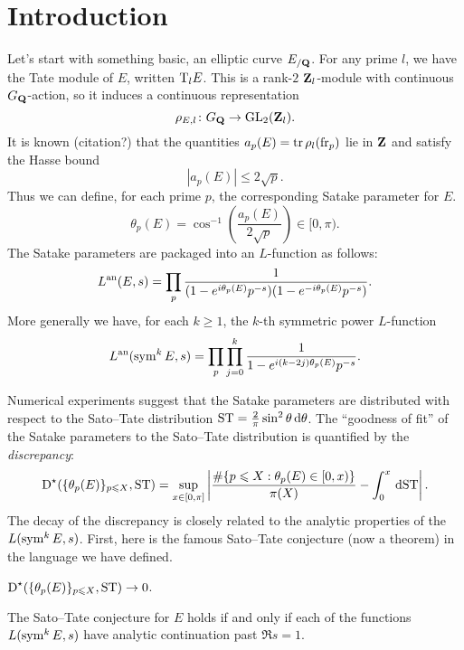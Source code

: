 
\chapter{Introduction}





Let's start with something basic, an elliptic curve $E_{/\mathbf{Q}}$. For any 
prime $l$, we have the Tate module of $E$, written $\mathrm{T}_l E$. This is a 
rank-$2$ $\mathbf{Z}_l$-module with continuous $G_{\mathbf{Q}}$-action, so it induces a 
continuous representation 
\[
	\rho_{E,l} \colon G_{\mathbf{Q}} \to \operatorname{GL}_2(\mathbf{Z}_l) .
\]
It is known (citation?) that the quantities $a_p(E) = \operatorname{tr} \rho_l(\mathrm{fr}_p)$ lie 
in $\mathbf{Z}$ and satisfy the Hasse bound 
\[
	|a_p(E)| \leqslant 2\sqrt p .
\]
Thus we can define, for each prime $p$, the corresponding Satake parameter for 
$E$. 
\[
	\theta_p(E) = \cos^{-1}\left(\frac{a_p(E)}{2\sqrt p}\right) \in [0,\pi) .
\]
The Satake parameters are packaged into an $L$-function as follows:
\[
	L^{\mathrm{an}}(E,s) = \prod_p \frac{1}{(1 - e^{i \theta_p(E)} p^{-s})(1- e^{-i \theta_p(E)} p^{-s})} .
\]
More generally we have, for each $k\geqslant 1$, the $k$-th symmetric power 
$L$-function 
\[
	L^{\mathrm{an}}(\operatorname{sym}^k E, s) = \prod_p \prod_{j=0}^k \frac{1}{1 - e^{i (k - 2j) \theta_p(E)} p^{-s}} .
\]

Numerical experiments suggest that the Satake parameters are distributed with 
respect to the Sato--Tate distribution 
$\mathrm{ST} = \frac{2}{\pi} \sin^2\theta\, \mathrm{d}\theta$. The ``goodness of fit'' of the 
Satake parameters to the Sato--Tate distribution is quantified by the 
\emph{discrepancy}:
\[
	\operatorname{D}^\star(\{\theta_p(E)\}_{p\leqslant X}, \mathrm{ST}) = \sup_{x\in [0,\pi]} \left| \frac{\#\{p\leqslant X : \theta_p(E)\in [0,x)\}}{\pi(X)} - \int_0^x \, \mathrm{d} \mathrm{ST}\right| .
\]
The decay of the discrepancy is closely related to the analytic properties of 
the $L(\operatorname{sym}^k E,s)$. First, here is the famous Sato--Tate conjecture (now a 
theorem) in the language we have defined. 

\begin{theorem}
$\operatorname{D}^\star(\{\theta_p(E)\}_{p\leqslant X}, \mathrm{ST}) \to 0$.  
\end{theorem}

\begin{theorem}
The Sato--Tate conjecture for $E$ holds if and only if each of the functions 
$L(\operatorname{sym}^k E,s)$ have analytic continuation past $\Re s=1$. 
\end{theorem}

